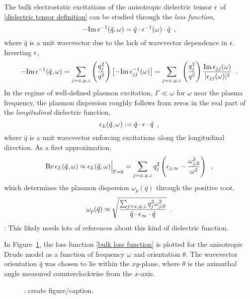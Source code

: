 The bulk electrostatic excitations of the anisotropic dielectric tensor $\epsilon$ of \eqref{dielectric tensor definition} can be studied through the {\it loss function},
\begin{equation}
    -\text{Im}\, \epsilon^{-1}(\hat q, \omega) = \hat q \cdot \epsilon^{-1}(\omega) \cdot \hat q
    \,\,\,,
\end{equation}
where $\hat q$ is a unit wavevector due to the lack of wavevector dependence in $\epsilon$.  Inverting $\epsilon$,
\begin{equation}
    \label{bulk loss function}
    -\text{Im}\,\epsilon^{-1}(\hat q, \omega) = \sum_{j=x,y,z} \left(\frac{q_j^2}{q^2}\right) \left[ -\text{Im}\,\epsilon_{jj}^{-1}(\omega)\right]
    =
    \sum_{j=x,y,z}\left(\frac{q_j^2}{q^2}\right)\frac{\text{Im}\,\epsilon_{jj}(\omega)}{|\epsilon_{jj}(\omega)|^2}
    \,\,\,.
\end{equation}
In the regime of well-defined plasmon excitation, $\Gamma \ll \omega$ for $\omega$ near the plasma frequency, the plasmon dispersion roughly follows from zeros in the real part of the {\it longitudinal} dielectric function,
\begin{equation}
    \epsilon_L(\hat q,\omega) :=\hat q\cdot \epsilon\cdot\hat q\,\,\,,
\end{equation}
where $\hat q$ is a unit wavevector enforcing excitations along the longitudinal direction.  As a first approximation,
\begin{equation}
    \label{longitudinal dielectric function without damping}
    \text{Re}\,\epsilon_L(\hat q, \omega) \approx \epsilon_L(\hat q, \omega)\Big|_{\Gamma = 0}
    =
    \sum_{j=x,y,z}q_j^2\left(\epsilon_{j,\infty} - \frac{\omega_{j,0}^2}{\omega^2}\right)
    \,\,\,,
\end{equation}
which determines the plasmon dispersion $\omega_p(\hat q)$ through the positive root,
\begin{equation}
    \omega_p(\hat q) \approx 
    \sqrt{\frac{\sum_{j=x,y,z}q_j^2 \omega_{j,0}^2}{\hat q \cdot \epsilon_{\infty} \cdot \hat q}}
    \,\,\,.
\end{equation}
: This likely needs lots of references about this kind of dielectric function.

In Figure~\ref{figure: anisotropic plasmon spectrum}, the loss function \eqref{bulk loss function} is plotted for the anisotropic Drude model as a function of frequency $\omega$ and orientation $\theta$.  The wavevector orientation $\hat q$ was chosen to lie within the $xy$-plane, where $\theta$ is the azimuthal angle measured counterclockwise from the $x$-axis.  

\begin{figure}
    \centering
    \caption{
        : create figure/caption.
    }
    \label{figure: anisotropic plasmon spectrum}
\end{figure}
